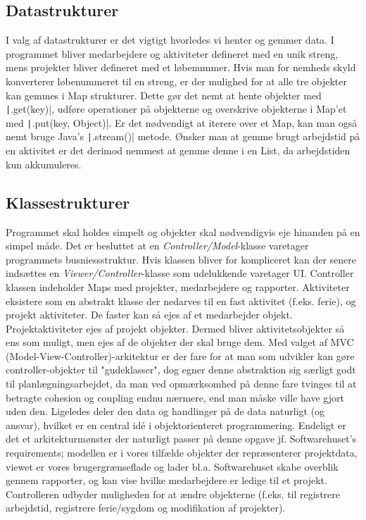 \subsection{Datastrukturer} I valg af datastrukturer er det vigtigt hvorledes vi henter og gemmer data. I programmet bliver medarbejdere og aktiviteter defineret med en unik streng, mens projekter bliver defineret med et løbenummer. Hvis man for nemheds skyld konverterer løbenummeret til en streng, er der mulighed for at alle tre objekter kan gemmes i Map strukturer. Dette gør det nemt at hente objekter med \texttt|.get(key)|, udføre operationer på objekterne og overskrive objekterne i Map'et med \texttt|.put(key, Object)|. Er det nødvendigt at iterere over et Map, kan man også nemt bruge Java's \texttt|.stream()| metode. Ønsker man at gemme brugt arbejdstid på en aktivitet er det derimod nemmest at gemme denne i en List, da arbejdstiden kun akkumuleres.
\subsection{Klassestrukturer} Programmet skal holdes simpelt og objekter skal nødvendigvis eje hinanden på en simpel måde. Det er besluttet at en \emph{Controller/Model}-klasse varetager programmets busniessstruktur. Hvis klassen bliver for kompliceret kan der senere indsættes en \emph{Viewer/Controller}-klasse som udelukkende varetager UI. Controller klassen indeholder Maps med projekter, medarbejdere og rapporter. Aktiviteter eksistere som en abstrakt klasse der nedarves til en fast aktivitet (f.eks. ferie), og projekt aktiviteter. De faster kan så ejes af et medarbejder objekt. Projektaktiviteter ejes af projekt objekter. Dermed bliver aktivitetsobjekter så ens som muligt, men ejes af de objekter der skal bruge dem. Med valget af MVC (Model-View-Controller)-arkitektur er der fare for at man som udvikler kan gøre controller-objekter til "gudeklasser", dog egner denne abstraktion sig særligt godt til planlægningsarbejdet, da man ved opmærksomhed på denne fare tvinges til at betragte cohesion og coupling endnu nærmere, end man måske ville have gjort uden den. Ligeledes deler den data og handlinger på de data naturligt (og ansvar), hvilket er en central idé i objektorienteret programmering. Endeligt er det et arkitekturmønster der naturligt passer på denne opgave jf. Softwarehuset's requirements; modellen er i vores tilfælde objekter der repræsenterer projektdata, viewet er vores brugergrænseflade og lader bl.a. Softwarehuset skabe overblik gennem rapporter, og kan vise hvilke medarbejdere er ledige til et projekt. Controlleren udbyder muligheden for at ændre objekterne (f.eks. til registrere arbejdstid, registrere ferie/sygdom og modifikation af projekter).